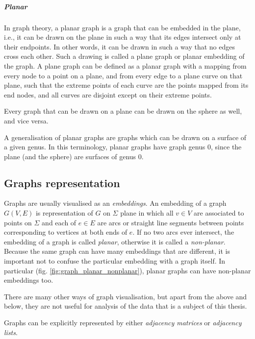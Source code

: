        \subparagraph{Planar}
        
          In graph theory, a planar graph is a graph that can be embedded in the plane, i.e., it can be drawn on the plane in such a way that its edges intersect only at their endpoints. In other words, it can be drawn in such a way that no edges cross each other.\cite{Trudeau1993,Diestel2012} Such a drawing is called a plane graph or planar embedding of the graph. A plane graph can be defined as a planar graph with a mapping from every node to a point on a plane, and from every edge to a plane curve on that plane, such that the extreme points of each curve are the points mapped from its end nodes, and all curves are disjoint except on their extreme points.

          Every graph that can be drawn on a plane can be drawn on the sphere as well, and vice versa.

          A generalisation of planar graphs are graphs which can be drawn on a surface of a given genus. In this terminology, planar graphs have graph genus $0$, since the plane (and the sphere) are surfaces of genus $0$.

  \subsection{Graphs representation}

    Graphs are usually visualised as an \emph{embeddings}. An embedding of a graph $G(V, E)$ is representation of $G$ on $\Sigma$ plane in which all $v \in V$ are associated to points on $\Sigma$ and each of $e \in E$ are arcs or straight line segments between points corresponding to vertices at both ends of $e$. If no two arcs ever intersect, the embedding of a graph is called \emph{planar}, otherwise it is called a \emph{non-planar}. Because the same graph can have many embeddings that are different, it is important not to confuse the particular embedding with a graph itself. In particular (fig. \ref{fig:graph_planar_nonplanar}), planar graphs can have non-planar embeddings too.

    There are many other ways of graph visualisation, but apart from the above and below, they are not useful for analysis of the data that is a subject of this thesis.

    Graphs can be explicitly represented by either \emph{adjacency matrices} or \emph{adjacency lists}.
        
